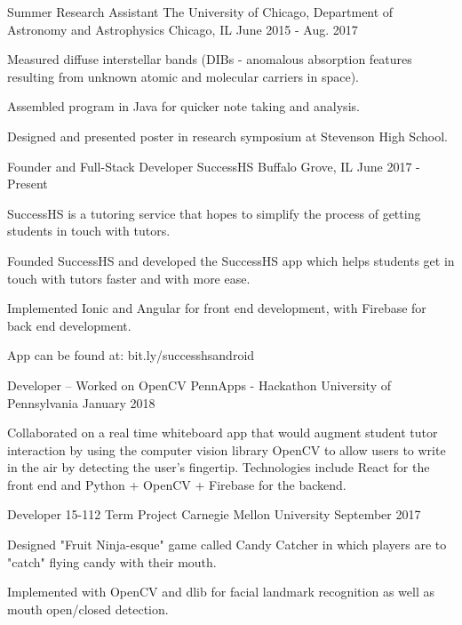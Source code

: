 \begin{cventries}
  \cventry
    {Summer Research Assistant}
    {The University of Chicago, Department of Astronomy and Astrophysics}
    {Chicago, IL}
    {June 2015 - Aug. 2017} 
    {
      \begin{cvitems}
        \item {Measured diffuse interstellar bands (DIBs - anomalous absorption features resulting from unknown atomic and molecular carriers in space).}
        \item {Assembled program in Java for quicker note taking and analysis.}
        \item {Designed and presented poster in research symposium at Stevenson High School.}
      \end{cvitems}
    }
  \cventry
    {Founder and Full-Stack Developer}
    {SuccessHS}
    {Buffalo Grove, IL}
    {June 2017 - Present}
    {
      \begin{cvitems}
        \item {SuccessHS is a tutoring service that hopes to simplify the process of getting students in touch with tutors.}
        \item {Founded SuccessHS and developed the SuccessHS app which helps students get in touch with tutors faster and with more ease.}
        \item {Implemented Ionic and Angular for front end development, with Firebase for back end development.}
        \item {App can be found at: bit.ly/successhsandroid}
      \end{cvitems}
    }
    
    \cventry
      {Developer -- Worked on OpenCV}
      {PennApps - Hackathon}
      {University of Pennsylvania}
      {January 2018}
      {
        \begin{cvitems}
            \item Collaborated on a real time whiteboard app that would augment student tutor interaction by using the computer vision library OpenCV to allow users to write in the air by detecting the user's fingertip. Technologies include React for the front end and Python + OpenCV + Firebase for the backend.
        \end{cvitems}
    }
    
    \cventry
      {Developer}
      {15-112 Term Project}
      {Carnegie Mellon University}
      {September 2017}
      {
        \begin{cvitems}
            \item Designed "Fruit Ninja-esque" game called Candy Catcher in which players are to "catch" flying candy with their mouth. 
            \item Implemented with OpenCV and dlib for facial landmark recognition as well as mouth open/closed detection.
        \end{cvitems}
    }
    

\end{cventries}
